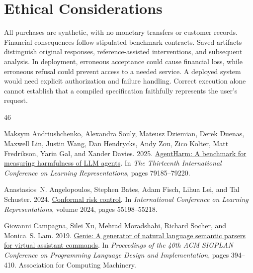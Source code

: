 \documentclass[11pt]{article}
\begin{document}
\section*{Ethical Considerations}
All purchases are synthetic, with no monetary transfers or customer records. Financial consequences follow stipulated benchmark contracts. Saved artifacts distinguish original responses, reference-assisted interventions, and subsequent analysis. In deployment, erroneous acceptance could cause financial loss, while erroneous refusal could prevent access to a needed service. A deployed system would need explicit authorization and failure handling. Correct execution alone cannot establish that a compiled specification faithfully represents the user's request.

\begin{thebibliography}{46}
\providecommand{\natexlab}[1]{#1}

Maksym Andriushchenko, Alexandra Souly, Mateusz Dziemian, Derek Duenas, Maxwell Lin, Justin Wang, Dan Hendrycks, Andy Zou, Zico Kolter, Matt Fredrikson, Yarin Gal, and Xander Davies. 2025.
\newblock \href {https://proceedings.iclr.cc/paper_files/paper/2025/hash/c493d23af93118975cdbc32cbe7323f5-Abstract-Conference.html} {{AgentHarm}: A benchmark for measuring harmfulness of {LLM} agents}.
\newblock In \emph{The Thirteenth International Conference on Learning Representations}, pages 79185--79220.

Anastasios~N. Angelopoulos, Stephen Bates, Adam Fisch, Lihua Lei, and Tal Schuster. 2024.
\newblock \href {https://proceedings.iclr.cc/paper_files/paper/2024/file/f3549ef9b5ff520a7e41ff3cc306ab2b-Paper-Conference.pdf} {Conformal risk control}.
\newblock In \emph{International Conference on Learning Representations}, volume 2024, pages 55198--55218.

Giovanni Campagna, Silei Xu, Mehrad Moradshahi, Richard Socher, and Monica~S. Lam. 2019.
\newblock \href {https://doi.org/10.1145/3314221.3314594} {{Genie}: A generator of natural language semantic parsers for virtual assistant commands}.
\newblock In \emph{Proceedings of the 40th ACM SIGPLAN Conference on Programming Language Design and Implementation}, pages 394--410. Association for Computing Machinery.


\end{thebibliography}
\end{document}
